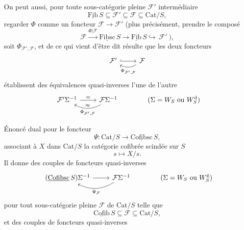 \documentclass[11pt]{article}
\newcommand{\msp}[1]{\marginpar{\footnotesize [#1]}}
\newcommand{\Cat}{\mathrm{Cat}}
\newcommand{\ul}[1]{\underline{\mathrm{#1}}}
\begin{document}
On peut aussi, pour toute sous-catégorie pleine $\mathcal{F}'$ intermédiaire
\[ \ul{Fib}\,S\subseteq\mathcal{F}'\subseteq\mathcal{F}\subseteq\Cat/S, \]
regarder $\Phi$ comme un foncteur $\mathcal{F}\longrightarrow\mathcal{F}'$ (plus précisément, prendre le composé
\[ \mathcal{F}\xrightarrow{\Phi|\mathcal{F}}\ul{Fibsc}\,S\longrightarrow\ul{Fib}\,S\hookrightarrow\ \mathcal{F}'\ ), \]
soit $\Phi_{\mathcal{F}',\mathcal{F}}$, et de ce qui vient d'être dit résulte que les deux foncteurs
\[
\begin{tikzcd}
\mathcal{F}' \arrow[r,hook] & \mathcal{F} \arrow[l,bend left,"\Phi_{\mathcal{F}',\mathcal{F}}"]
\end{tikzcd}
\]
\msp{page 77}
établissent des équivalences quasi-inverses l'une de l'autre
\[
\begin{tikzcd}
\mathcal{F}'\Sigma^{-1} \arrow[r,"\approx"] & \mathcal{F}\Sigma^{-1} \arrow[l,bend left,"\approx"',"\Phi_{\mathcal{F}',\mathcal{F}}"]
\end{tikzcd}
\qquad\qquad(\Sigma=W_S\text{ ou }W_S^{\mathrm{d}})
\]

Énoncé dual pour le foncteur
\[ \Psi : \Cat/S\longrightarrow\ul{Cofibsc}\,S, \]
associant à $X$ dans $\Cat/S$ la catégorie cofibrée scindée sur $S$
\[ s\longmapsto X/s. \]
Il donne des couples de foncteurs quasi-inverses
\[
\begin{tikzcd}
(\ul{Cofibsc}\,S)\Sigma^{-1} \arrow[r] & \mathcal{F}\Sigma^{-1} \arrow[l,bend left,"\Psi_{\mathcal{F}}"]
\end{tikzcd}
\qquad\qquad(\Sigma=W_S\text{ ou }W_S^{\mathrm{g}})
\]
pour tout sous-catégorie pleine $\mathcal{F}$ de $\Cat/S$ telle que %
\[ \ul{Cofib}\,S\subseteq\mathcal{F}\subseteq\Cat/S, \]
et des couples de foncteurs quasi-inverses
\end{document}
